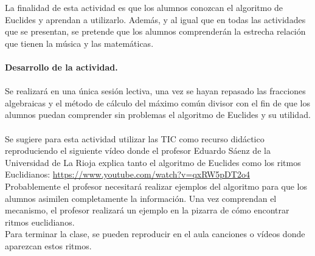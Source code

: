 \documentclass[a4paper, openright, 11pt, titlepage]{report}
\theoremstyle{definition}\newtheorem{defin}[propo]{Definition}
\theoremstyle{definition}\newtheorem{obser}[propo]{Remark}
\theoremstyle{definition}\newtheorem{ejem}[propo]{Ejemplo}
\theoremstyle{definition}\newtheorem{algoritmo}[propo]{Algoritmo}
\begin{document}
\begin{itemize}
    La finalidad de esta actividad es que los alumnos conozcan el algoritmo de Euclides y aprendan a utilizarlo. Además, y al igual que en todas las actividades que se presentan, se pretende que los alumnos comprenderán la estrecha relación que tienen la música y las matemáticas.\\\\
    \textbf{Desarrollo de la actividad.}\\\\
    Se realizará en una única sesión lectiva, una vez se hayan repasado las fracciones algebraicas y el método de cálculo del máximo común divisor con el fin de que los alumnos puedan comprender sin problemas el algoritmo de Euclides y su utilidad.\\\\
    Se sugiere para esta actividad utilizar las TIC como recurso didáctico reproduciendo el siguiente vídeo donde el profesor Eduardo Sáenz de la Universidad de La Rioja explica tanto el algoritmo de Euclides como los ritmos Euclidianos: \url{https://www.youtube.com/watch?v=qxRW5pDT2o4}\\
    Probablemente el profesor necesitará realizar ejemplos del algoritmo para que los alumnos asimilen completamente la información. Una vez comprendan el mecanismo, el profesor realizará un ejemplo en la pizarra de cómo encontrar ritmos euclidianos.\\
    Para terminar la clase, se pueden reproducir en el aula canciones o vídeos donde aparezcan estos ritmos. 
\end{itemize}
\end{document}
